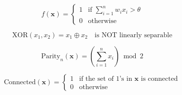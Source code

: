 
\begin{equation}
f(\mathbf{x}) = \begin{cases}
1 & \text{if } \sum_{i=1}^{n} w_i x_i > \theta \\
0 & \text{otherwise}
\end{cases}
\end{equation}

\begin{equation}
\text{XOR}(x_1, x_2) = x_1 \oplus x_2 \quad \text{is NOT linearly separable}
\end{equation}

\begin{equation}
\text{Parity}_n(\mathbf{x}) = \left( \sum_{i=1}^{n} x_i \right) \bmod 2
\end{equation}

\begin{equation}
\text{Connected}(\mathbf{x}) = \begin{cases}
1 & \text{if the set of 1's in }\mathbf{x}\text{ is connected} \\
0 & \text{otherwise}
\end{cases}
\end{equation}
